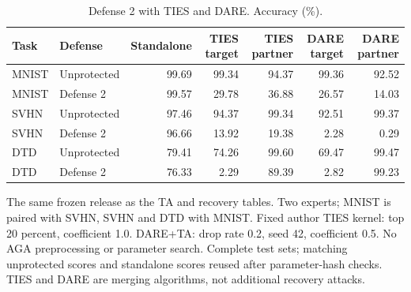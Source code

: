 \begin{table}[t]
\centering\small
\setlength{\tabcolsep}{4pt}
\caption{Defense 2 with TIES and DARE. Accuracy (\%).}
\label{tab:defense2_mergers}
\begin{tabular}{@{}llrrrrr@{}}
\toprule
Task & Defense & Standalone & TIES target & TIES partner & DARE target & DARE partner \\
\midrule
MNIST & Unprotected & 99.69 & 99.34 & 94.37 & 99.36 & 92.52 \\
MNIST & Defense 2 & 99.57 & 29.78 & 36.88 & 26.57 & 14.03 \\
\midrule
SVHN & Unprotected & 97.46 & 94.37 & 99.34 & 92.51 & 99.37 \\
SVHN & Defense 2 & 96.66 & 13.92 & 19.38 & 2.28 & 0.29 \\
\midrule
DTD & Unprotected & 79.41 & 74.26 & 99.60 & 69.47 & 99.47 \\
DTD & Defense 2 & 76.33 & 2.29 & 89.39 & 2.82 & 99.23 \\
\bottomrule
\end{tabular}
\par\smallskip
\begin{minipage}{\textwidth}\footnotesize The same frozen release as the TA and recovery tables. Two experts; MNIST is paired with SVHN, SVHN and DTD with MNIST. Fixed author TIES kernel: top 20 percent, coefficient 1.0. DARE+TA: drop rate 0.2, seed 42, coefficient 0.5. No AGA preprocessing or parameter search. Complete test sets; matching unprotected scores and standalone scores reused after parameter-hash checks. TIES and DARE are merging algorithms, not additional recovery attacks.\end{minipage}
\end{table}
